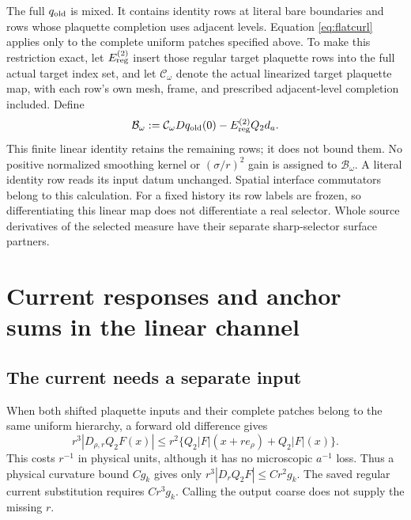 \documentclass[11pt,letterpaper]{article}
\theoremstyle{plain}
\theoremstyle{remark}\newtheorem{remark}[theorem]{Scope}
\providecommand{\mathscr}{\mathcal}
\begin{document}
The full $q_{\rm old}$ is mixed. It contains identity rows at literal bare
boundaries and rows whose plaquette completion uses adjacent levels.
Equation \eqref{eq:flatcurl} applies only to the complete uniform patches
specified above. To make this restriction exact, let $E_{\rm reg}^{(2)}$
insert those regular target plaquette rows into the full actual target
index set, and let $\mathscr C_\omega$ denote the actual linearized target
plaquette map, with each row's own mesh, frame, and prescribed adjacent-level
completion included. Define
\begin{equation}
 \mathcal B_\omega
 :=\mathscr C_\omega Dq_{\rm old}(0)
   -E_{\rm reg}^{(2)}Q_2d_a.
 \label{eq:boundary}
\end{equation}
This finite linear identity retains the remaining rows; it does not bound
them. No positive normalized smoothing kernel or $(\sigma/r)^2$ gain is
assigned to $\mathcal B_\omega$. A literal identity row reads its input
datum unchanged. Spatial interface commutators belong to this calculation.
For a fixed history its row labels are frozen, so differentiating this
linear map does not differentiate a real selector. Whole source derivatives
of the selected measure have their separate sharp-selector surface partners.

\section{Current responses and anchor sums in the linear channel}

\subsection{The current needs a separate input}

When both shifted plaquette inputs and their complete patches belong to the
same uniform hierarchy, a forward old difference gives
\begin{equation}
 r^3|D_{\rho,r}Q_2F(x)|
 \le r^2\{Q_2|F|(x+re_\rho)+Q_2|F|(x)\}.
 \label{eq:currentcrudebound}
\end{equation}
This costs $r^{-1}$ in physical units, although it has no microscopic
$a^{-1}$ loss. Thus a physical curvature bound $Cg_k$ gives only
$r^3|D_rQ_2F|\le Cr^2g_k$. The saved regular current substitution requires
$Cr^3g_k$. Calling the output coarse does not supply the missing $r$.
\end{document}
